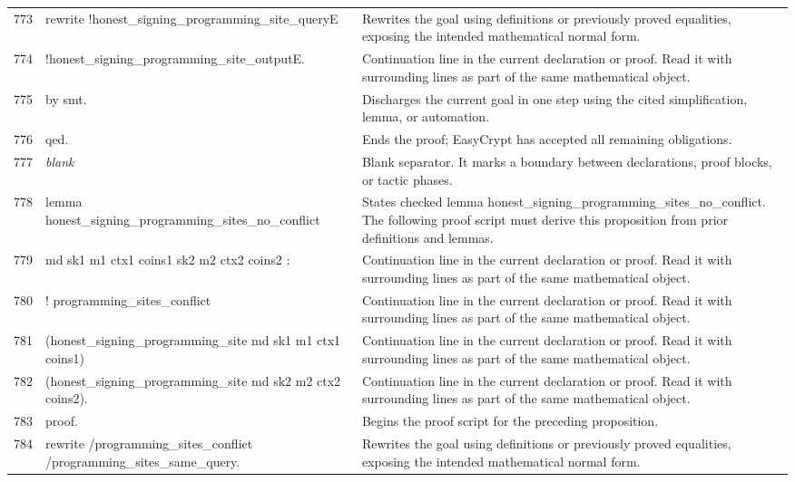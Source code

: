 \documentclass[10pt]{article}
\begin{document}
\begin{longtable}{r L{0.53\textwidth} L{0.37\textwidth}}
773 & {\ttfamily\scriptsize rewrite !honest\_signing\_programming\_site\_queryE} & Rewrites the goal using definitions or previously proved equalities, exposing the intended mathematical normal form. \\
774 & {\ttfamily\scriptsize         !honest\_signing\_programming\_site\_outputE.} & Continuation line in the current declaration or proof.  Read it with surrounding lines as part of the same mathematical object. \\
775 & {\ttfamily\scriptsize by smt.} & Discharges the current goal in one step using the cited simplification, lemma, or automation. \\
776 & {\ttfamily\scriptsize qed.} & Ends the proof; EasyCrypt has accepted all remaining obligations. \\
777 & {\ttfamily\scriptsize \emph{blank}} & Blank separator.  It marks a boundary between declarations, proof blocks, or tactic phases. \\
778 & {\ttfamily\scriptsize lemma honest\_signing\_programming\_sites\_no\_conflict} & States checked lemma honest\_signing\_programming\_sites\_no\_conflict.  The following proof script must derive this proposition from prior definitions and lemmas. \\
779 & {\ttfamily\scriptsize   md sk1 m1 ctx1 coins1 sk2 m2 ctx2 coins2 :} & Continuation line in the current declaration or proof.  Read it with surrounding lines as part of the same mathematical object. \\
780 & {\ttfamily\scriptsize   ! programming\_sites\_conflict} & Continuation line in the current declaration or proof.  Read it with surrounding lines as part of the same mathematical object. \\
781 & {\ttfamily\scriptsize       (honest\_signing\_programming\_site md sk1 m1 ctx1 coins1)} & Continuation line in the current declaration or proof.  Read it with surrounding lines as part of the same mathematical object. \\
782 & {\ttfamily\scriptsize       (honest\_signing\_programming\_site md sk2 m2 ctx2 coins2).} & Continuation line in the current declaration or proof.  Read it with surrounding lines as part of the same mathematical object. \\
783 & {\ttfamily\scriptsize proof.} & Begins the proof script for the preceding proposition. \\
784 & {\ttfamily\scriptsize rewrite /programming\_sites\_conflict /programming\_sites\_same\_query.} & Rewrites the goal using definitions or previously proved equalities, exposing the intended mathematical normal form. \\

\end{longtable}
\end{document}
